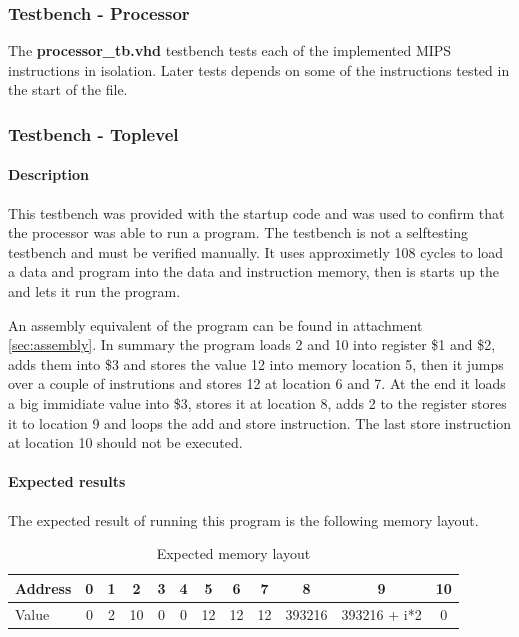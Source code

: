 \subsubsection{Testbench - Processor}
The {\bf processor\_tb.vhd} testbench tests each of the implemented MIPS instructions in isolation. Later tests depends on some of the instructions tested in the start of the file.
\subsubsection{Testbench - Toplevel}

\paragraph{Description}

This testbench was provided with the startup code and was used to confirm that the processor was able to run a program. The testbench is not a selftesting testbench and must be verified manually. It uses approximetly 108 cycles to load a data and program into the data and instruction memory, then is starts up the and lets it run the program.

An assembly equivalent of the program can be found in attachment \ref{sec:assembly}.
In summary the program loads 2 and 10 into register \$1 and \$2, adds them into \$3 and stores the value 12 into memory location 5, then it jumps over a couple of instrutions and stores 12 at location 6 and 7. At the end it loads a big immidiate value into \$3, stores it at location 8, adds 2 to the register stores it to location 9 and loops the add and store instruction. The last store instruction at location 10 should not be executed.

\paragraph{Expected results}
\label{sec:exp-res}
The expected result of running this program is the following memory layout. 
\begin{table}[h]
	\label{tab:exp-res}
	\begin{tabular}{|l|c|c|c|c|c|c|c|c|c|c|c|}
		\hline
		Address &  0 &  1 &  2 &  3 &  4 &  5 &  6 &  7 &  8 &  9 & 10 \\
		\hline
		Value   &  0 &  2 & 10 &  0 & 0 & 12  & 12 & 12 & 393216 & 393216 + i*2 & 0\\
		\hline
	\end{tabular}
	\caption{Expected memory layout}
\end{table}


